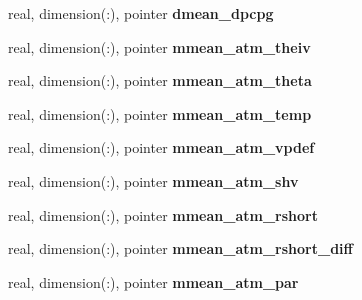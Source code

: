 \begin{DoxyCompactItemize}
\item 
\hypertarget{structed__state__vars_1_1polygontype_a83402ad7fde58e0fcec4d946e39ddcbe}{
real, dimension(:), pointer {\bfseries dmean\_\-dpcpg}}
\label{structed__state__vars_1_1polygontype_a83402ad7fde58e0fcec4d946e39ddcbe}

\item 
\hypertarget{structed__state__vars_1_1polygontype_a259def0f5e8126eaafdc5130a2b5bbb6}{
real, dimension(:), pointer {\bfseries mmean\_\-atm\_\-theiv}}
\label{structed__state__vars_1_1polygontype_a259def0f5e8126eaafdc5130a2b5bbb6}

\item 
\hypertarget{structed__state__vars_1_1polygontype_a2a051fb9fe0283267cfd77679feffdc5}{
real, dimension(:), pointer {\bfseries mmean\_\-atm\_\-theta}}
\label{structed__state__vars_1_1polygontype_a2a051fb9fe0283267cfd77679feffdc5}

\item 
\hypertarget{structed__state__vars_1_1polygontype_ac0e68a453f01043ccc7aee448a0fc1e8}{
real, dimension(:), pointer {\bfseries mmean\_\-atm\_\-temp}}
\label{structed__state__vars_1_1polygontype_ac0e68a453f01043ccc7aee448a0fc1e8}

\item 
\hypertarget{structed__state__vars_1_1polygontype_a730e43aca3d0f99504d8e9e069aac973}{
real, dimension(:), pointer {\bfseries mmean\_\-atm\_\-vpdef}}
\label{structed__state__vars_1_1polygontype_a730e43aca3d0f99504d8e9e069aac973}

\item 
\hypertarget{structed__state__vars_1_1polygontype_ae85c43ae0f01c5958816a1137e8ac7b5}{
real, dimension(:), pointer {\bfseries mmean\_\-atm\_\-shv}}
\label{structed__state__vars_1_1polygontype_ae85c43ae0f01c5958816a1137e8ac7b5}

\item 
\hypertarget{structed__state__vars_1_1polygontype_a0a5145fdb40fbe3d61ec98613888888e}{
real, dimension(:), pointer {\bfseries mmean\_\-atm\_\-rshort}}
\label{structed__state__vars_1_1polygontype_a0a5145fdb40fbe3d61ec98613888888e}

\item 
\hypertarget{structed__state__vars_1_1polygontype_a89039471f0cdc7082d604f7cf02c7d67}{
real, dimension(:), pointer {\bfseries mmean\_\-atm\_\-rshort\_\-diff}}
\label{structed__state__vars_1_1polygontype_a89039471f0cdc7082d604f7cf02c7d67}

\item 
\hypertarget{structed__state__vars_1_1polygontype_a7201da6cf5168f1cff2196b134d6c8ba}{
real, dimension(:), pointer {\bfseries mmean\_\-atm\_\-par}}
\label{structed__state__vars_1_1polygontype_a7201da6cf5168f1cff2196b134d6c8ba}


\end{DoxyCompactItemize}
